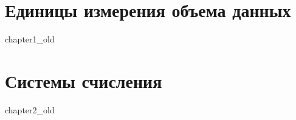 \documentclass[a5paper,14pt]{report}
\begin{document}
\chapter{Единицы измерения объема данных}
 {chapter1_old}

\chapter{Системы счисления}
 {chapter2_old}









\end{document}
